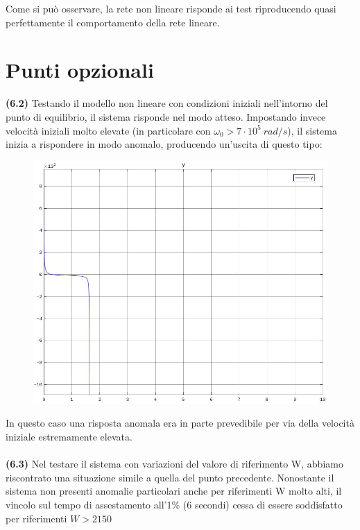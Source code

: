 \documentclass[a4paper,12pt,italian]{article}
\begin{document}
Come si può osservare, la rete non lineare risponde ai test riproducendo quasi perfettamente il comportamento della rete lineare.

\newpage

\section{Punti opzionali}

\textbf{(6.2)} Testando il modello non lineare con condizioni iniziali nell'intorno del punto di equilibrio, il sistema risponde nel modo atteso.
Impostando invece velocità iniziali molto elevate (in particolare con ${\omega_0 >7\cdot10^5~rad/s}$), il sistema inizia a rispondere in modo anomalo,
producendo un'uscita di questo tipo:

\begin{figure}[h!]
    \begin{center}
        \includegraphics[scale=0.35]{img/risposta_omega_iniz_elevato.jpg}
    \end{center}
\end{figure}
In questo caso una risposta anomala era in parte prevedibile per via della velocità iniziale estremamente elevata.\\ \\
\textbf{(6.3)}
Nel testare il sistema con variazioni del valore di riferimento W, abbiamo riscontrato una situazione simile a quella del punto precedente.
Nonostante il sistema non presenti anomalie particolari anche per riferimenti W molto alti, il vincolo sul tempo di assestamento all'1\% (6 secondi) cessa di essere soddisfatto per riferimenti $W > 2150$
\end{document}
